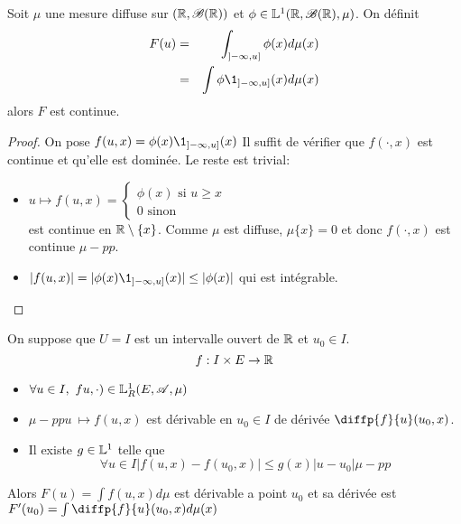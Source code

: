 \begin{example}
	Soit $\mu$ une mesure diffuse sur $(\mathbb{R}, \mathscr{B}(\mathbb{R}))$ et $\phi \in \mathbb{L}^1(\mathbb{R}, \mathscr{B}(\mathbb{R}), \mu)$.
	On définit \begin{eqnarray*}
		F(u) &=&  \int_{]-\infty, u]} \phi(x)d\mu(x)\\
		& = & \int \phi \1_{]-\infty, u]}(x)d\mu(x)
	\end{eqnarray*}
	alors $F$ est continue.

	\begin{proof}
		On pose $f(u,x) = \phi(x)\1_{]-\infty, u]}(x)$
		Il suffit de vérifier que $f(\cdot, x)$ est continue et qu'elle est dominée. Le reste est trivial: \\
		\begin{itemize}
			\item $u \mapsto f(u,x) = \left\{
				      \begin{array}{l}
					      \phi(x) \text{ si } u \geq x \\
					      0 \text{ sinon}
				      \end{array}
				      \right.$ \\
			      est continue en $\mathbb{R}\setminus\{x\}$. Comme $\mu$ est diffuse, $\mu \{x\} = 0$ et donc $f(\cdot, x)$ est continue $\mu-pp$.
			\item $|f(u,x)| = |\phi(x)\1_{]-\infty, u]}(x)| \leq |\phi(x)|$ qui est intégrable.
		\end{itemize}
	\end{proof}
\end{example}


\begin{theorem}
	On suppose que $U = I$ est un intervalle ouvert de $\mathbb{R}$ et $u_0 \in I$.\\
	$$ f: I\times E \to \mathbb{R}$$
	\begin{itemize}
		\item $\forall u \in I, \ fu, \cdot) \in \mathbb{L}^1_R(E,\mathscr{A}, \mu)$
		\item $\mu-pp u \ \mapsto f(u,x)$ est dérivable en $u_0 \in I$ de dérivée $\diffp{f}{u} (u_0, x)$.
		\item Il existe $g\in \mathbb{L}^1$ telle que
		      $$ \forall u\in I |f(u,x) - f(u_0,x)| \leq g(x)|u-u_0| \mu-pp$$
	\end{itemize}

	Alors $F(u) = \int f(u,x)d\mu$ est dérivable a point $u_0$ et sa dérivée est $F'(u_0) = \int \diffp{f}{u}(u_0,x)d\mu(x)$
\end{theorem}

